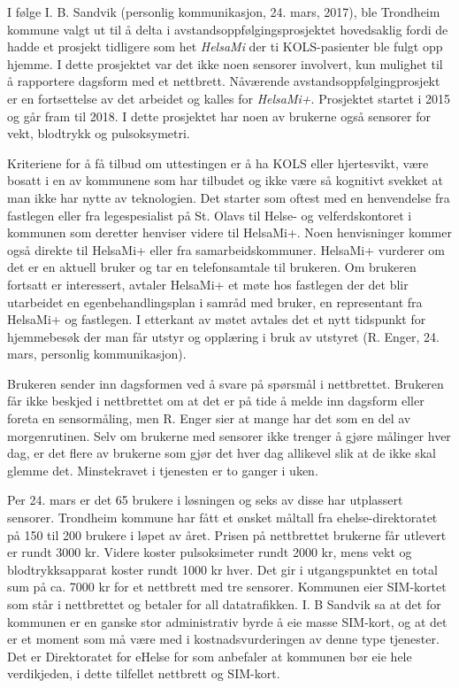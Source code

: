 I følge I. B. Sandvik (personlig kommunikasjon, 24. mars, 2017), ble Trondheim kommune valgt ut til å delta i avstandsoppfølgingsprosjektet hovedsaklig fordi de hadde et
prosjekt tidligere som het \textit{HelsaMi} der ti KOLS-pasienter ble fulgt opp hjemme. I dette prosjektet var det ikke noen sensorer involvert,
kun mulighet til å rapportere dagsform med et nettbrett. Nåværende avstandsoppfølgingprosjekt er en fortsettelse av det arbeidet
og kalles for \textit{HelsaMi+}. Prosjektet startet i 2015 og går fram til 2018. I dette prosjektet har noen av brukerne også sensorer
for vekt, blodtrykk og pulsoksymetri.

Kriteriene for å få tilbud om uttestingen er å ha KOLS eller hjertesvikt, være bosatt i en av kommunene som har tilbudet og ikke være så kognitivt
svekket at man ikke har nytte av teknologien. Det starter som oftest med en henvendelse fra fastlegen eller fra legespesialist på St. Olavs
til Helse- og velferdskontoret i kommunen som deretter
henviser videre til HelsaMi+. Noen henvisninger kommer også direkte til HelsaMi+ eller fra samarbeidskommuner. HelsaMi+ vurderer om det er en aktuell
bruker og tar en telefonsamtale til brukeren. Om brukeren fortsatt er interessert, avtaler HelsaMi+ et møte hos fastlegen der det blir utarbeidet en
egenbehandlingsplan i samråd med bruker, en representant fra HelsaMi+ og fastlegen. I etterkant av møtet avtales det et nytt tidspunkt for
hjemmebesøk der man får utstyr og opplæring i bruk av utstyret (R. Enger, 24. mars, personlig kommunikasjon).

Brukeren sender inn dagsformen ved å svare på spørsmål i nettbrettet.  Brukeren får ikke beskjed i nettbrettet om at det er på tide å melde inn dagsform eller foreta en sensormåling, men R. Enger
sier at mange har det som en del av morgenrutinen. Selv om brukerne med sensorer ikke trenger å gjøre målinger hver dag, er det flere av brukerne
som gjør det hver dag allikevel slik at de ikke skal glemme det. Minstekravet i tjenesten er to ganger i uken.

Per 24. mars er det 65 brukere i løsningen og seks av disse har utplassert sensorer. Trondheim kommune har fått et ønsket måltall fra
ehelse-direktoratet på 150 til 200 brukere i løpet av året. Prisen på nettbrettet brukerne får utlevert er rundt 3000 kr. Videre koster
pulsoksimeter rundt 2000 kr, mens vekt og blodtrykksapparat koster rundt 1000 kr hver. Det gir i utgangspunktet en total sum på ca. 7000 kr
for et nettbrett med tre sensorer. Kommunen eier SIM-kortet som står i nettbrettet og betaler for all datatrafikken. I. B Sandvik sa at
det for kommunen er en ganske stor administrativ byrde å eie masse SIM-kort, og at det er et moment som må være med i kostnadsvurderingen
av denne type tjenester. Det er Direktoratet for eHelse for som anbefaler at kommunen bør eie hele verdikjeden, i dette tilfellet nettbrett
og SIM-kort.

